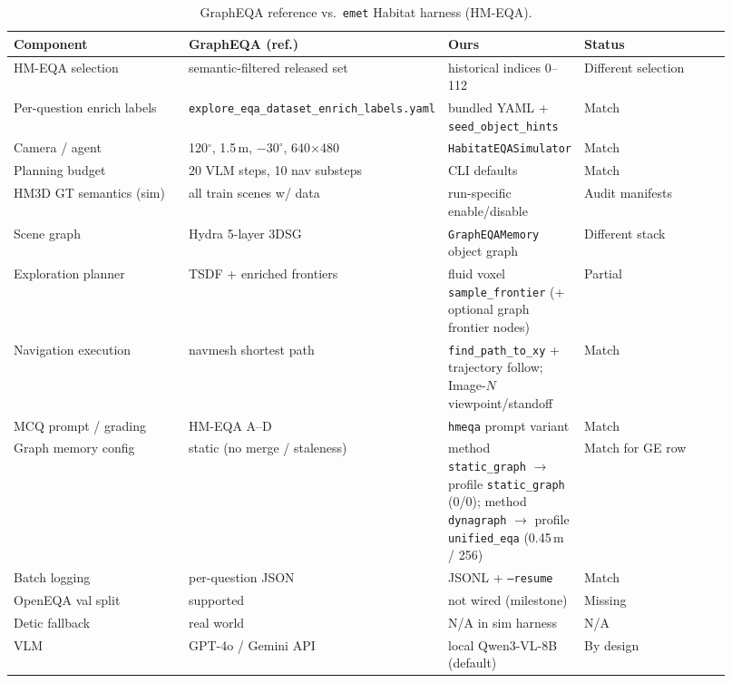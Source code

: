 \begin{table}[t]
  \centering
  \caption{GraphEQA reference vs.\ \texttt{emet} Habitat harness (HM-EQA).}
  \label{tab:habitat_parity}
  \small
  \begin{tabular}{@{}p{0.26\linewidth}p{0.30\linewidth}p{0.14\linewidth}p{0.22\linewidth}@{}}
    \toprule
    Component & GraphEQA (ref.) & Ours & Status \\
    \midrule
    HM-EQA selection & semantic-filtered released set & historical indices 0--112 & Different selection \\
    Per-question enrich labels & \texttt{explore\_eqa\_dataset\_enrich\_labels.yaml} & bundled YAML + \texttt{seed\_object\_hints} & Match \\
    Camera / agent & 120$^\circ$, 1.5\,m, $-30^\circ$, 640$\times$480 & \texttt{HabitatEQASimulator} & Match \\
    Planning budget & 20 VLM steps, 10 nav substeps & CLI defaults & Match \\
    HM3D GT semantics (sim) & all train scenes w/ data & run-specific enable/disable & Audit manifests \\
    Scene graph & Hydra 5-layer 3DSG & \texttt{GraphEQAMemory} object graph & Different stack \\
    Exploration planner & TSDF + enriched frontiers & fluid voxel \texttt{sample\_frontier} (+ optional graph frontier nodes) & Partial \\
    Navigation execution & navmesh shortest path & \texttt{find\_path\_to\_xy} + trajectory follow; Image-$N$ viewpoint/standoff & Match \\
    MCQ prompt / grading & HM-EQA A--D & \texttt{hmeqa} prompt variant & Match \\
    Graph memory config & static (no merge / staleness) & method \texttt{static\_graph} $\rightarrow$ profile \texttt{static\_graph} (0/0); method \texttt{dynagraph} $\rightarrow$ profile \texttt{unified\_eqa} (0.45\,m / 256) & Match for GE row \\
    Batch logging & per-question JSON & JSONL + \texttt{--resume} & Match \\
    OpenEQA val split & supported & not wired (milestone) & Missing \\
    Detic fallback & real world & N/A in sim harness & N/A \\
    VLM & GPT-4o / Gemini API & local Qwen3-VL-8B (default) & By design \\
    \bottomrule
  \end{tabular}
\end{table}

